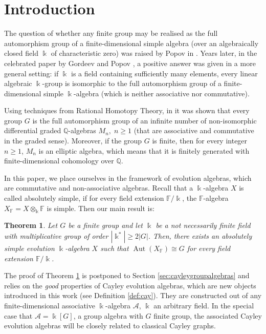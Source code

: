 \documentclass[a4paper,12pt]{amsart}
\newtheorem{thmx}{Theorem}
\theoremstyle{definition}
\theoremstyle{remark}
\newcommand{\Aut}{\operatorname{Aut}}
\begin{document}
\section{Introduction}

The question of whether any finite group may be realised as the full automorphism group of a finite-dimensional simple algebra (over an algebraically closed field $\Bbbk$ of characteristic zero) was raised by Popov in \cite{Popov}. Years later,  in the celebrated paper  by Gordeev and Popov \cite{PopovAnnals},  a positive answer was given  in a more general setting:  if $\Bbbk$ is a field containing sufficiently many elements, every linear algebraic $\Bbbk$-group is isomorphic to the full automorphism group of a finite-dimensional simple $\Bbbk$-algebra (which is neither associative nor commutative).  

Using techniques from Rational Homotopy Theory,  in   \cite[Proposition 4.2, Corollary 4.11(2)]{cmv3} it was shown that every group $G$ is the full automorphism group of an infinite number of non-isomorphic differential graded $\mathbb Q$-algebras $M_n,\; n \geq 1$ (that are associative and commutative in the graded sense). Moreover, if the group $G$ is finite, then for every integer $n \geq 1$, $M_n$ is an elliptic algebra, which means that it is finitely generated with finite-dimensional cohomology over $\mathbb Q.$  

In this paper, we place ourselves in the framework of evolution algebras, which are commutative and non-associative algebras. 
Recall that a  $\Bbbk$-algebra $X$ is called absolutely simple, if for every field extension $\mathbb{F}/\Bbbk$, the  $\mathbb{F}$-algebra $X_{\mathbb F}=X\otimes_\Bbbk {\mathbb F}$ is simple. Then our main result is:

\begin{thmx}\label{thm:main}
	Let $G$ be a finite group and let $\Bbbk$ be a not necessarily finite field with multiplicative group of order $|\Bbbk^*| \geq 2|G|$. Then,  there exists an absolutely simple evolution $\Bbbk$-algebra $X$ such that $\Aut(X_{\mathbb F})\cong G$ for every  field extension $\mathbb{F}/\Bbbk$.
\end{thmx}



The proof of Theorem \ref{thm:main} is postponed to Section \ref{sec:cayleygroupalgebras} and relies on the \emph{good} properties of Cayley evolution algebras, which are new objects introduced in this work (see Definition \ref{def:cay}). They are constructed  out of any finite-dimensional associative $\Bbbk$-algebra $\mathcal A$, $\Bbbk$ an arbitrary field. In the special case that  $\mathcal A= \Bbbk[G]$,  a group algebra with $G$ finite group,  the associated Cayley evolution algebras will be closely related to classical Cayley graphs.
\end{document}
